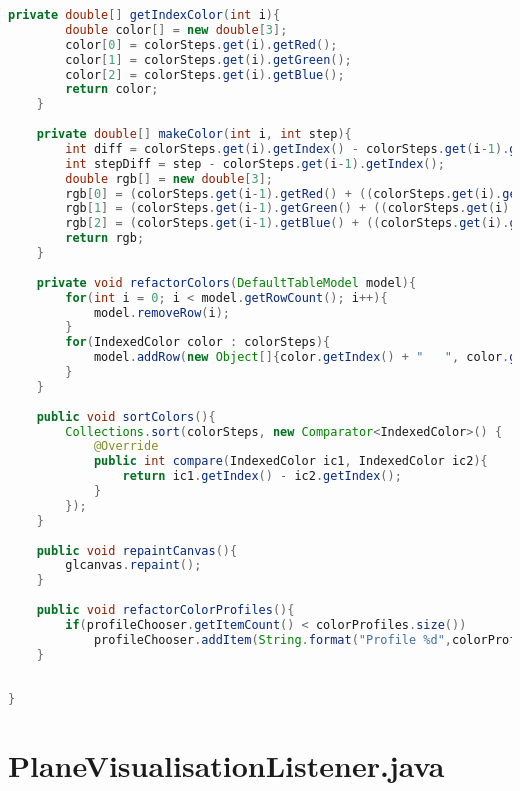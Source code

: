 \documentclass[pdftex,a4paper,10pt,titlepage]{article}
\begin{document}
\begin{lstlisting}[language=java, breaklines=true]
    private double[] getIndexColor(int i){
        double color[] = new double[3];
        color[0] = colorSteps.get(i).getRed();
        color[1] = colorSteps.get(i).getGreen();
        color[2] = colorSteps.get(i).getBlue();
        return color;
    }
    
    private double[] makeColor(int i, int step){
        int diff = colorSteps.get(i).getIndex() - colorSteps.get(i-1).getIndex();
        int stepDiff = step - colorSteps.get(i-1).getIndex();
        double rgb[] = new double[3];
        rgb[0] = (colorSteps.get(i-1).getRed() + ((colorSteps.get(i).getRed() - colorSteps.get(i-1).getRed()) / diff * stepDiff)) / 255.0;
        rgb[1] = (colorSteps.get(i-1).getGreen() + ((colorSteps.get(i).getGreen() - colorSteps.get(i-1).getGreen()) / diff * stepDiff)) / 255.0;
        rgb[2] = (colorSteps.get(i-1).getBlue() + ((colorSteps.get(i).getBlue() - colorSteps.get(i-1).getBlue()) / diff * stepDiff)) / 255.0;
        return rgb;
    }
    
    private void refactorColors(DefaultTableModel model){
        for(int i = 0; i < model.getRowCount(); i++){
            model.removeRow(i);
        }
        for(IndexedColor color : colorSteps){
            model.addRow(new Object[]{color.getIndex() + "   ", color.getRGB() + "   ", "remove"});
        }
    }
    
    public void sortColors(){
        Collections.sort(colorSteps, new Comparator<IndexedColor>() {
            @Override
            public int compare(IndexedColor ic1, IndexedColor ic2){
                return ic1.getIndex() - ic2.getIndex();
            }
        });
    }
    
    public void repaintCanvas(){
        glcanvas.repaint();
    }
    
    public void refactorColorProfiles(){
        if(profileChooser.getItemCount() < colorProfiles.size())
            profileChooser.addItem(String.format("Profile %d",colorProfiles.size()));
    }
    
    
}

\end{lstlisting}


\section{PlaneVisualisationListener.java}
\end{document}
